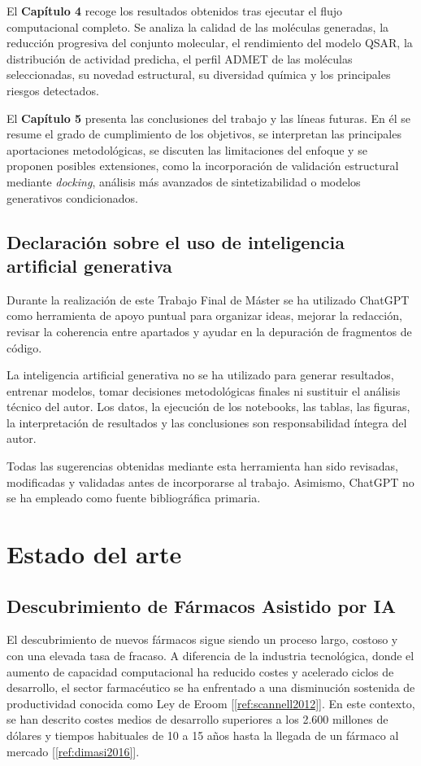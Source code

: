 \documentclass[IB]{TFUOC}%
\begin{document}
El \textbf{Capítulo 4} recoge los resultados obtenidos tras ejecutar el flujo computacional completo. Se analiza la calidad de las moléculas generadas, la reducción progresiva del conjunto molecular, el rendimiento del modelo QSAR, la distribución de actividad predicha, el perfil ADMET de las moléculas seleccionadas, su novedad estructural, su diversidad química y los principales riesgos detectados.

El \textbf{Capítulo 5} presenta las conclusiones del trabajo y las líneas futuras. En él se resume el grado de cumplimiento de los objetivos, se interpretan las principales aportaciones metodológicas, se discuten las limitaciones del enfoque y se proponen posibles extensiones, como la incorporación de validación estructural mediante \textit{docking}, análisis más avanzados de sintetizabilidad o modelos generativos condicionados.

\section{Declaración sobre el uso de inteligencia artificial generativa}

Durante la realización de este Trabajo Final de Máster se ha utilizado ChatGPT como herramienta de apoyo puntual para organizar ideas, mejorar la redacción, revisar la coherencia entre apartados y ayudar en la depuración de fragmentos de código.

La inteligencia artificial generativa no se ha utilizado para generar resultados, entrenar modelos, tomar decisiones metodológicas finales ni sustituir el análisis técnico del autor. Los datos, la ejecución de los notebooks, las tablas, las figuras, la interpretación de resultados y las conclusiones son responsabilidad íntegra del autor.

Todas las sugerencias obtenidas mediante esta herramienta han sido revisadas, modificadas y validadas antes de incorporarse al trabajo. Asimismo, ChatGPT no se ha empleado como fuente bibliográfica primaria.

\chapter{Estado del arte}

\section{Descubrimiento de Fármacos Asistido por IA}

El descubrimiento de nuevos fármacos sigue siendo un proceso largo, costoso y con una elevada tasa de fracaso. A diferencia de la industria tecnológica, donde el aumento de capacidad computacional ha reducido costes y acelerado ciclos de desarrollo, el sector farmacéutico se ha enfrentado a una disminución sostenida de productividad conocida como Ley de Eroom [\ref{ref:scannell2012}]. En este contexto, se han descrito costes medios de desarrollo superiores a los 2.600 millones de dólares y tiempos habituales de 10 a 15 años hasta la llegada de un fármaco al mercado [\ref{ref:dimasi2016}].
\end{document}
